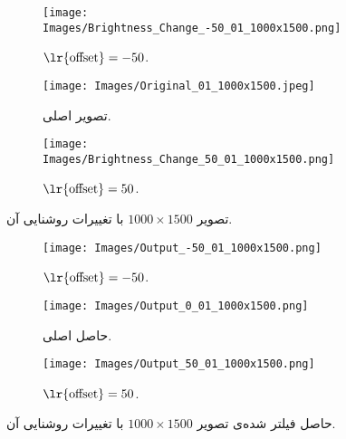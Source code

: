 \documentclass[12pt,onecolumn,a4paper]{article}
\begin{document}
\begin{figure}
     \centering
     \begin{subfigure}[b]{0.3\textwidth}
         \centering
         \texttt{[image: Images/Brightness\_Change\_-50\_01\_1000x1500.png]}
         \caption{$\text{\lr{offset}}=-50$.}
         \label{Figure:01_1000x1500_-50}
     \end{subfigure}
     \hfill
     \begin{subfigure}[b]{0.3\textwidth}
         \centering
         \texttt{[image: Images/Original\_01\_1000x1500.jpeg]}
         \caption{تصویر اصلی.}
         \label{Figure:01_1000x1500_0}
     \end{subfigure}
     \hfill
     \begin{subfigure}[b]{0.3\textwidth}
         \centering
         \texttt{[image: Images/Brightness\_Change\_50\_01\_1000x1500.png]}
         \caption{$\text{\lr{offset}}=50$.}
         \label{Figure:01_1000x1500_50}
     \end{subfigure}
\caption{تصویر $1000 \times 1500$ با تغییرات روشنایی آن.}
\label{Figure:01_1000x1500}
\end{figure}

\begin{figure}
     \centering
     \begin{subfigure}[b]{0.3\textwidth}
         \centering
         \texttt{[image: Images/Output\_-50\_01\_1000x1500.png]}
         \caption{$\text{\lr{offset}}=-50$.}
         \label{Figure:Output_01_1000x1500_-50}
     \end{subfigure}
     \hfill
     \begin{subfigure}[b]{0.3\textwidth}
         \centering
         \texttt{[image: Images/Output\_0\_01\_1000x1500.png]}
         \caption{حاصل اصلی.}
         \label{Figure:Output_01_1000x1500_0}
     \end{subfigure}
     \hfill
     \begin{subfigure}[b]{0.3\textwidth}
         \centering
         \texttt{[image: Images/Output\_50\_01\_1000x1500.png]}
         \caption{$\text{\lr{offset}}=50$.}
         \label{Figure:Output_01_1000x1500_50}
     \end{subfigure}
\caption{حاصل فیلتر شده‌ی تصویر $1000 \times 1500$ با تغییرات روشنایی آن.}
\label{Figure:Output_01_1000x1500}
\end{figure}
\end{document}
